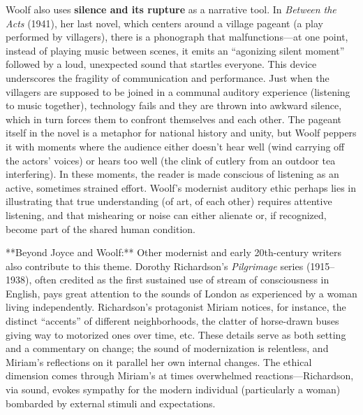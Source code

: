 \documentclass[12pt]{report}
\begin{document}
Woolf also uses \textbf{silence and its rupture} as a narrative tool. In \textit{Between the Acts} (1941), her last novel, which centers around a village pageant (a play performed by villagers), there is a phonograph that malfunctions—at one point, instead of playing music between scenes, it emits an “agonizing silent moment” followed by a loud, unexpected sound that startles everyone. This device underscores the fragility of communication and performance. Just when the villagers are supposed to be joined in a communal auditory experience (listening to music together), technology fails and they are thrown into awkward silence, which in turn forces them to confront themselves and each other. The pageant itself in the novel is a metaphor for national history and unity, but Woolf peppers it with moments where the audience either doesn’t hear well (wind carrying off the actors’ voices) or hears too well (the clink of cutlery from an outdoor tea interfering). In these moments, the reader is made conscious of listening as an active, sometimes strained effort. Woolf’s modernist auditory ethic perhaps lies in illustrating that true understanding (of art, of each other) requires attentive listening, and that mishearing or noise can either alienate or, if recognized, become part of the shared human condition.

**Beyond Joyce and Woolf:** Other modernist and early 20th-century writers also contribute to this theme. Dorothy Richardson’s \textit{Pilgrimage} series (1915–1938), often credited as the first sustained use of stream of consciousness in English, pays great attention to the sounds of London as experienced by a woman living independently. Richardson’s protagonist Miriam notices, for instance, the distinct “accents” of different neighborhoods, the clatter of horse-drawn buses giving way to motorized ones over time, etc. These details serve as both setting and a commentary on change; the sound of modernization is relentless, and Miriam’s reflections on it parallel her own internal changes. The ethical dimension comes through Miriam’s at times overwhelmed reactions—Richardson, via sound, evokes sympathy for the modern individual (particularly a woman) bombarded by external stimuli and expectations.
\end{document}
